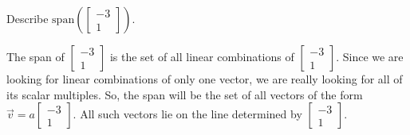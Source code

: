 \documentclass{ximera}
\begin{document}
\begin{example}\label{ex:describespan}
Describe $\mbox{span}\left(\begin{bmatrix}-3\\1\end{bmatrix}\right)$.
\begin{explanation}
The span of $\begin{bmatrix}-3\\1\end{bmatrix}$ is the set of all linear combinations of $\begin{bmatrix}-3\\1\end{bmatrix}$.  Since we are looking for linear combinations of only one vector, we are really looking for all of its scalar multiples.  So, the span will be the set of all vectors of the form $\vec{v}=a\begin{bmatrix}-3\\1\end{bmatrix}$.  All such vectors lie on the line determined by $\begin{bmatrix}-3\\1\end{bmatrix}$.

\begin{center}
\end{center}


\end{explanation}
\end{example}
\end{document}
